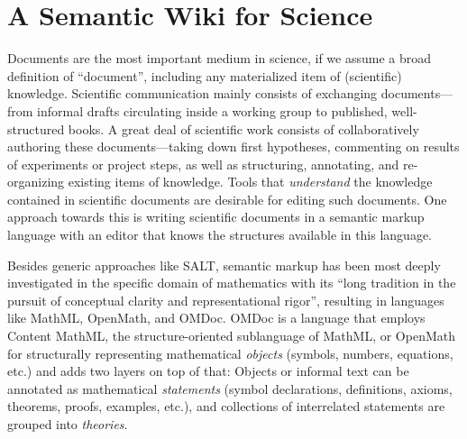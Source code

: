 \section{A Semantic Wiki for Science}
\label{sec:science}

\begin{figure}
  \centering
  \vspace{-.9cm}
  \vspace{-1.2cm}
\end{figure}
Documents are the most important medium in science, if we assume a broad definition of
``document'', including any materialized item of (scientific) knowledge.  Scientific
communication mainly consists of exchanging documents---from informal drafts circulating
inside a working group to published, well-structured books.  A great deal of scientific
work consists of collaboratively authoring these documents---taking down first hypotheses,
commenting on results of experiments or project steps, as well as structuring, annotating,
and re-organizing existing items of knowledge.  Tools that
\emph{understand} the knowledge contained in scientific documents are desirable for
editing such documents.  One approach towards this is writing scientific documents in a
semantic markup language with an editor that knows the structures available in this
language.

Besides generic approaches like SALT\cite{Groza:SALT07}, semantic markup has
been most deeply investigated in the specific domain of mathematics with its
``long tradition in the pursuit of conceptual clarity and representational
rigor''\cite{Kohlhase:omdoc1.2}, resulting in languages like
MathML\cite{CarlisleEd:MathML07}, OpenMath\cite{BusCapCar:2oms04}, and
OMDoc\cite{Kohlhase:omdoc1.2}.  OMDoc is a language that employs Content MathML,
the structure-oriented sublanguage of MathML, or OpenMath for structurally
representing mathematical \emph{objects} (symbols, numbers, equations, etc.) and
adds two layers on top of that: Objects or informal text can be annotated as
mathematical \emph{statements} (symbol declarations, definitions, axioms,
theorems, proofs, examples, etc.), and collections of interrelated statements
are grouped into \emph{theories}.

